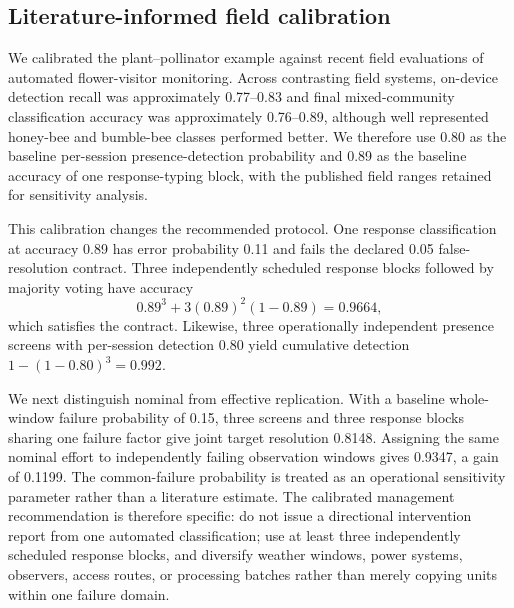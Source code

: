 \subsection{Literature-informed field calibration}

We calibrated the plant--pollinator example against recent field evaluations of automated flower-visitor monitoring. Across contrasting field systems, on-device detection recall was approximately 0.77--0.83 and final mixed-community classification accuracy was approximately 0.76--0.89, although well represented honey-bee and bumble-bee classes performed better. We therefore use 0.80 as the baseline per-session presence-detection probability and 0.89 as the baseline accuracy of one response-typing block, with the published field ranges retained for sensitivity analysis.

This calibration changes the recommended protocol. One response classification at accuracy 0.89 has error probability 0.11 and fails the declared 0.05 false-resolution contract. Three independently scheduled response blocks followed by majority voting have accuracy
\[
0.89^3+3(0.89)^2(1-0.89)=0.9664,
\]
which satisfies the contract. Likewise, three operationally independent presence screens with per-session detection 0.80 yield cumulative detection $1-(1-0.80)^3=0.992$.

We next distinguish nominal from effective replication. With a baseline whole-window failure probability of 0.15, three screens and three response blocks sharing one failure factor give joint target resolution 0.8148. Assigning the same nominal effort to independently failing observation windows gives 0.9347, a gain of 0.1199. The common-failure probability is treated as an operational sensitivity parameter rather than a literature estimate. The calibrated management recommendation is therefore specific: do not issue a directional intervention report from one automated classification; use at least three independently scheduled response blocks, and diversify weather windows, power systems, observers, access routes, or processing batches rather than merely copying units within one failure domain.
